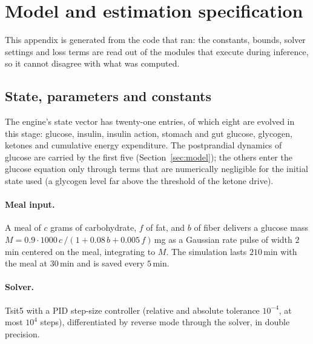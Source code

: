 \section{Model and estimation specification}
\label{app:spec}

This appendix is generated from the code that ran: the constants, bounds, solver settings and loss terms are
read out of the modules that execute during inference, so it cannot disagree with what was computed.

\subsection{State, parameters and constants}

The engine's state vector has twenty-one entries, of which eight are evolved in this stage: glucose,
insulin, insulin action, stomach and gut glucose, glycogen, ketones and cumulative energy expenditure. The
postprandial dynamics of glucose are carried by the first five (Section~\ref{sec:model}); the others
enter the glucose equation only through terms that are numerically negligible for the initial state used
(a glycogen level far above the threshold of the ketone drive).

\begin{table}[h]
\centering\small

\caption{Upper block: the free parameters (rows one to three) and the non-fitted parameters of the model, with
reference population values and inference bounds; body weight $W$ is populated from each subject's recorded weight
rather than held constant across subjects (the listed $78$\,kg is the reference-profile default). Lower block: the fixed constants.}
\label{tab:spec}
\end{table}

\paragraph{Meal input.}
A meal of $c$ grams of carbohydrate, $f$ of fat, and $b$ of fiber delivers a glucose mass
$M=0.9\cdot 1000\,c\,/(1+0.08\,b+0.005\,f)$\,mg as a Gaussian rate pulse of width $2$\,min centered on the
meal, integrating to $M$. The simulation lasts $210$\,min with the meal at $30$\,min and is saved every
$5$\,min.

\paragraph{Solver.}
Tsit5 with a PID step-size controller (relative and absolute tolerance $10^{-4}$, at most $10^{4}$ steps),
differentiated by reverse mode through the solver, in double precision.

